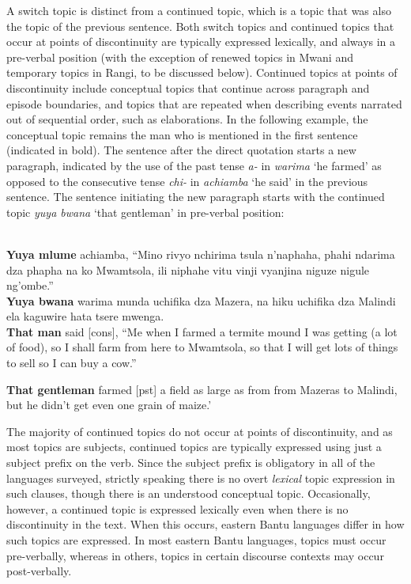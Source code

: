 \documentclass[output=paper]{langsci/langscibook}
\begin{document}
A switch topic is distinct from a continued topic, which is a topic that was also the topic of the previous sentence. Both switch topics and continued topics that occur at points of discontinuity are typically expressed lexically, and always in a pre-verbal position (with the exception of renewed topics in Mwani and temporary topics in Rangi, to be discussed below). Continued topics at points of discontinuity include conceptual topics that continue across paragraph and episode boundaries, and topics that are repeated when describing events narrated out of sequential order, such as elaborations. In the following example, the conceptual topic remains the man who is mentioned in the first sentence (indicated in bold). The sentence after the direct quotation starts a new paragraph, indicated by the use of the past tense \textit{a}\textit{\nobreakdash-} in \textit{w}\textit{a}\textit{rima} ‘he farmed’ as opposed to the consecutive tense \textit{chi}\textit{\nobreakdash-} in \textit{a}\textit{chi}\textit{amba} ‘he said’ in the previous sentence. The sentence initiating the new paragraph starts with the continued topic \textit{yuya bwana} ‘that gentleman’ in pre-verbal position:

\ea\label{ex:}
\\
\textbf{Yuy}\textbf{a mlume} achiamba, “Mino rivyo nchirima tsula n’naphaha, phahi ndarima dza phapha na ko Mwamtsola, ili niphahe vitu vinji vyanjina niguze nigule ng'ombe.”\\
\textbf{Yuya bwana} warima munda uchifika dza Mazera, na hiku uchifika dza Malindi ela kaguwire hata tsere mwenga.\\

\glt \textbf{\textup{That man}} \textup{said}\textup{ [}\textup{cons}\textup{], “Me when I farmed a termite mound I was getting (a lot of food), so I shall farm from here to Mwamtsola, so that I will get lots of things to sell so I can buy a cow.”}

\glt \textbf{\textup{That gentleman}} \textup{farmed}\textup{ [}\textup{pst}\textup{] a field as large as from from Mazeras to Malindi, but he didn’t get even one grain of maize.’}
\z

The majority of continued topics do not occur at points of discontinuity, and as most topics are subjects, continued topics are typically expressed using just a subject prefix on the verb. Since the subject prefix is obligatory in all of the languages surveyed, strictly speaking there is no overt \textit{lexical} topic expression in such clauses, though there is an understood conceptual topic. Occasionally, however, a continued topic is expressed lexically even when there is no discontinuity in the text. When this occurs, eastern Bantu languages differ in how such topics are expressed. In most eastern Bantu languages, topics must occur pre-verbally, whereas in others, topics in certain discourse contexts may occur post-verbally.
\end{document}
